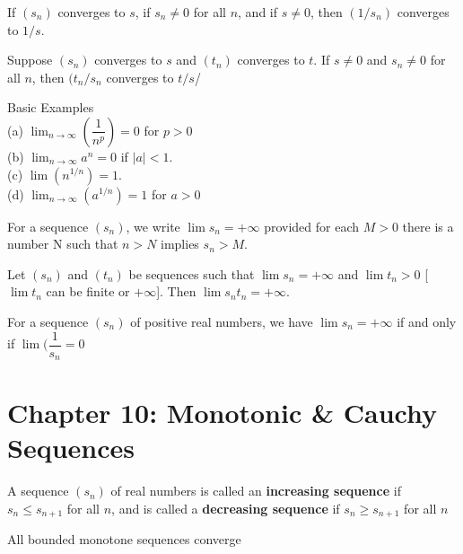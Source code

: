 \documentclass[10pt]{article}
\begin{document}
\begin{lem}
If $(s_n)$ converges to $s$, if $s_n \neq 0$ for all $n$, and if $s \neq 0$, then $(1/s_n)$ converges to $1/s$. 
\end{lem}

\begin{thm}
Suppose $(s_n)$ converges to $s$ and $(t_n)$ converges to $t$. If $s \neq 0$ and $s_n \neq 0$ for all $n$, then $(t_n/s_n$ converges to $t/s$/
\end{thm}

\begin{thm} Basic Examples\\
(a) $\lim_{n \to \infty} (\dfrac{1}{n^p}) = 0$ for $p > 0$\\
(b) $\lim_{n \to \infty} a^n = 0$ if $|a| < 1$.\\
(c) $\lim(n^{1/n}) = 1$.\\
(d) $\lim_{n \to \infty}(a^{1/n}) = 1$ for $a > 0$
\end{thm}

\begin{defn}
For a sequence $(s_n)$, we write $\lim s_n = + \infty$ provided for each $M > 0$ there is a number N such that $n > N$ implies $s_n > M$.
\end{defn}

\begin{thm}
Let $(s_n)$ and $(t_n)$ be sequences such that $\lim s_n = +\infty$ and $\lim t_n > 0$ [$\lim t_n$ can be finite or $+\infty$]. Then $\lim s_nt_n = +\infty$.
\end{thm}

\begin{thm}
For a sequence $(s_n)$ of positive real numbers, we have $\lim s_n = +\infty$ if and only if $\lim(\dfrac{1}{s_n} = 0$
\end{thm}

\section*{Chapter 10: Monotonic \& Cauchy Sequences}
\begin{defn}
A sequence $(s_n)$ of real numbers is called an \textbf{increasing sequence} if $s_n \leq s_{n+1}$ for all $n$, and is called a \textbf{decreasing sequence} if $s_n \geq s_{n+1}$ for all $n$
\end{defn}

\begin{thm}
All bounded monotone sequences converge
\end{thm}
\end{document}
